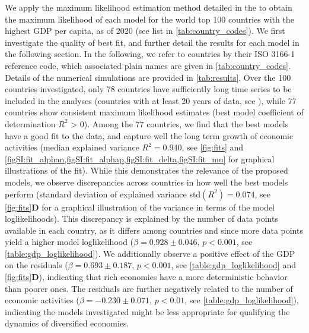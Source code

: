 We apply the maximum likelihood estimation method detailed in the  to obtain the maximum likelihood of each model for the world top 100 countries with the highest GDP per capita, as of 2020 (see list in \cref{tab:country_codes}). 
% 
We first investigate the quality of best fit, and further detail the results for each model in the following section. %
% 
In the following, we refer to countries by their ISO 3166-1 reference code, which associated plain names are given in \cref{tab:country_codes}.
% 
Details of the numerical simulations are provided in \cref{tab:results}.
%
Over the 100 countries investigated, only 78 countries have sufficiently long time series to be included in the analyses (countries with at least 20 years of data, see ), while 77 countries show consistent maximum likelihood estimates (best model coefficient of determination $R^2$ > 0).
% 
Among the 77 countries, we find that the best models have a good fit to the data, and capture well the long term growth of economic activities (median explained variance $R^2 = 0.940$, see \cref{fig:fits} and \cref{figSI:fit_alphan,figSI:fit_alphap,figSI:fit_delta,figSI:fit_mu} for graphical illustrations of the fit).
% 
While this demonstrates the relevance of the proposed models, we observe discrepancies across countries in how well the best models perform (standard deviation of explained variance std$(R^2)= 0.074$, see \cref{fig:fits}\textbf{D} for a graphical illustration of the variance in terms of the model loglikelihoods).
% 
% 
This discrepancy is explained by the number of data points available in each country, as it differs among countries and since more data points yield a higher model loglikelihood ($\beta = 0.928 \pm 0.046$, $p<0.001$, see \cref{table:gdp_loglikelihood}).
% 
We additionally observe a positive effect of the GDP on the residuals ($\beta = 0.693 \pm 0.187$, $p<0.001$, see \cref{table:gdp_loglikelihood} and \cref{fig:fits}\textbf{D}), indicating that rich economies have a more deterministic behavior than poorer ones. The residuals are further negatively related to the number of economic activities ($\beta = -0.230 \pm 0.071$, $p<0.01$, see \cref{table:gdp_loglikelihood}), indicating the models investigated might be less appropriate for qualifying the dynamics of diversified economies.
% 
% 

